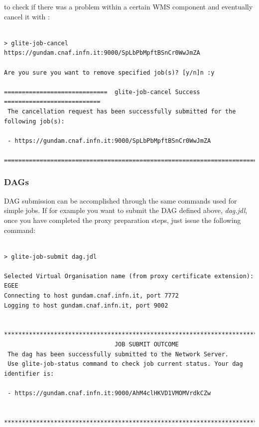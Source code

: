 to check if there was a problem within a certain WMS component and eventually cancel it with :

\smallskip
\begin{scriptsize}
\begin{verbatim}

> glite-job-cancel https://gundam.cnaf.infn.it:9000/SpLbPbMpftBSnCr0WwJmZA

Are you sure you want to remove specified job(s)? [y/n]n :y

=============================  glite-job-cancel Success  ===========================
 The cancellation request has been successfully submitted for the following job(s):

 - https://gundam.cnaf.infn.it:9000/SpLbPbMpftBSnCr0WwJmZA

====================================================================================

\end{verbatim}
\end{scriptsize}
\smallskip

\subsubsection {DAGs}

DAG submission can be accomplished through the same commands used for simple jobs. 
If for example you want to submit the DAG defined above, \emph{dag.jdl}, once you have 
completed the proxy preparation steps, just issue the following command: 

\smallskip
\begin{scriptsize}
\begin{verbatim}

> glite-job-submit dag.jdl 

Selected Virtual Organisation name (from proxy certificate extension): EGEE
Connecting to host gundam.cnaf.infn.it, port 7772
Logging to host gundam.cnaf.infn.it, port 9002


**************************************************************************************
                               JOB SUBMIT OUTCOME
 The dag has been successfully submitted to the Network Server.
 Use glite-job-status command to check job current status. Your dag identifier is:

 - https://gundam.cnaf.infn.it:9000/AhM4clHKVD1VMOMVrdkCZw


**************************************************************************************
\end{verbatim}
\end{scriptsize}


